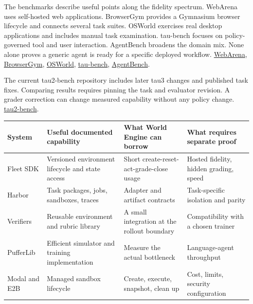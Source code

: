 \documentclass[
  11pt,
  letterpaper,
]{article}
\newcounter{none} %
\begin{document}
The benchmarks describe useful points along the fidelity spectrum.
WebArena uses self-hosted web applications. BrowserGym provides a
Gymnasium browser lifecycle and connects several task suites. OSWorld
exercises real desktop applications and includes manual task
examination. tau-bench focuses on policy-governed tool and user
interaction. AgentBench broadens the domain mix. None alone proves a
generic agent is ready for a specific deployed workflow.
\href{https://github.com/web-arena-x/webarena}{WebArena},
\href{https://github.com/ServiceNow/BrowserGym}{BrowserGym},
\href{https://github.com/xlang-ai/OSWorld}{OSWorld},
\href{https://arxiv.org/abs/2406.12045}{tau-bench},
\href{https://github.com/THUDM/AgentBench}{AgentBench}.

The current tau2-bench repository includes later tau3 changes and
published task fixes. Comparing results requires pinning the task and
evaluator revision. A grader correction can change measured capability
without any policy change.
\href{https://github.com/sierra-research/tau2-bench}{tau2-bench}.

{\def\LTcaptype{none} %
\begin{longtable}[]{@{}
  >{\raggedright\arraybackslash}p{}
  >{\raggedright\arraybackslash}p{}
  >{\raggedright\arraybackslash}p{}
  >{\raggedright\arraybackslash}p{}@{}}
\toprule\noalign{}
\begin{minipage}[b]{\linewidth}\raggedright
System
\end{minipage} & \begin{minipage}[b]{\linewidth}\raggedright
Useful documented capability
\end{minipage} & \begin{minipage}[b]{\linewidth}\raggedright
What World Engine can borrow
\end{minipage} & \begin{minipage}[b]{\linewidth}\raggedright
What requires separate proof
\end{minipage} \\
\midrule\noalign{}
\endhead
\bottomrule\noalign{}
\endlastfoot
Fleet SDK & Versioned environment lifecycle and state access & Short
create-reset-act-grade-close usage & Hosted fidelity, hidden grading,
speed \\
Harbor & Task packages, jobs, sandboxes, traces & Adapter and artifact
contracts & Task-specific isolation and parity \\
Verifiers & Reusable environment and rubric library & A small
integration at the rollout boundary & Compatibility with a chosen
trainer \\
PufferLib & Efficient simulator and training implementation & Measure
the actual bottleneck & Language-agent throughput \\
Modal and E2B & Managed sandbox lifecycle & Create, execute, snapshot,
clean up & Cost, limits, security configuration \\
\end{longtable}
}
\end{document}
